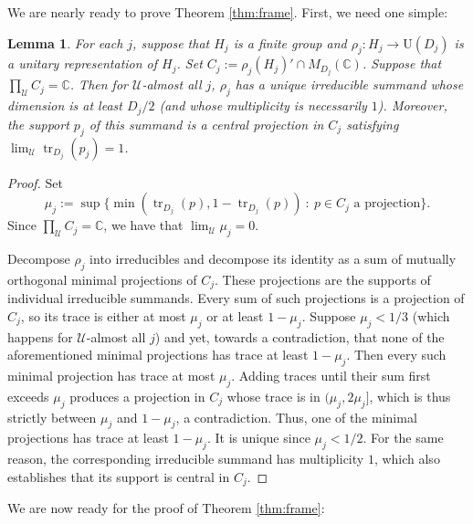 \documentclass[12pt]{amsart}
\numberwithin{equation}{section}
\newtheorem{lem}[thm]{Lemma}
\theoremstyle{definition}
\newcommand{\C}{\mathbb{C}}
\def\bb{\mathbb}
\def\cal{\mathcal}
\DeclareMathOperator{\tr}{tr}
\newcommand\cU{{\cal U}}
\begin{document}
We are nearly ready to prove Theorem \ref{thm:frame}.  First, we need one simple:

\begin{lem}\label{rec:dominant}
For each $j$, suppose that $H_j$ is a finite group and $\rho_j:H_j\to \mathrm{U}(D_j)$ is a unitary representation of $H_j$.  Set $C_j:=\rho_j(H_j)'\cap M_{D_j}(\C)$.  Suppose that $\prod_\cU C_j=\mathbb C$.  Then for $\cU$-almost all $j$, $\rho_j$ has a unique irreducible summand whose dimension is at least $D_j/2$ (and whose multiplicity is necessarily $1$).  Moreover, the support $p_j$ of this summand is a central projection in $C_j$ satisfying $\lim_\cU \tr_{D_j}(p_j)=1$. 
\end{lem}

\begin{proof}
Set
\[
 \mu_j:=\sup
       \{\min(\tr_{D_j}(p),1-\tr_{D_j}(p)) \ : \ p\in C_j \text{ a projection}\}.
\]
Since $\prod_\cU C_j=\bb C$, we have that $\lim_\cU \mu_j=0$.

Decompose $\rho_j$ into irreducibles and decompose its
identity as a sum of mutually orthogonal minimal projections of
$C_j$.  These projections are the supports of individual
irreducible summands.  Every sum of such projections is a
projection of $C_j$, so its trace is either at most $\mu_j$
or at least $1-\mu_j$.  Suppose $\mu_j<1/3$ (which happens for $\cU$-almost all $j$) and yet, towards a contradiction, that none of the aforementioned minimal projections has trace at least $1-\mu_j$.  Then every
such minimal projection has trace at most $\mu_j$.  Adding traces until
their sum first exceeds $\mu_j$ produces a projection in $C_j$ whose trace is in
$(\mu_j,2\mu_j]$, which is thus strictly between $\mu_j$ and
$1-\mu_j$, a contradiction.  Thus, one of the minimal projections has trace at least $1-\mu_j$.
It is unique since $\mu_j<1/2$.  For the same reason, the corresponding irreducible summand has multiplicity $1$, which also establishes that its support is central in $C_j$.
\end{proof}

We are now ready for the proof of Theorem \ref{thm:frame}:
\end{document}
